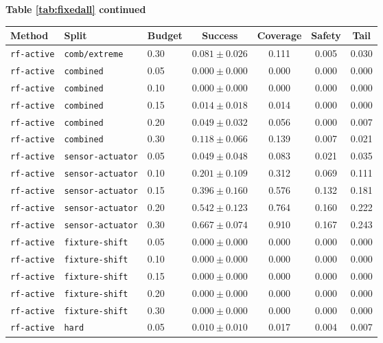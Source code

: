 \documentclass{article}
\begin{document}
\begin{center}
\textbf{Table \ref{tab:fixedall} continued}\\[0.4ex]
\begin{tabular}{lllcccc}
\toprule
Method & Split & Budget & Success & Coverage & Safety & Tail \\
\midrule
\texttt{rf-active} & \texttt{comb/extreme} & 0.30 & $0.081 \pm 0.026$ & 0.111 & 0.005 & 0.030 \\
\texttt{rf-active} & \texttt{combined} & 0.05 & $0.000 \pm 0.000$ & 0.000 & 0.000 & 0.000 \\
\texttt{rf-active} & \texttt{combined} & 0.10 & $0.000 \pm 0.000$ & 0.000 & 0.000 & 0.000 \\
\texttt{rf-active} & \texttt{combined} & 0.15 & $0.014 \pm 0.018$ & 0.014 & 0.000 & 0.000 \\
\texttt{rf-active} & \texttt{combined} & 0.20 & $0.049 \pm 0.032$ & 0.056 & 0.000 & 0.007 \\
\texttt{rf-active} & \texttt{combined} & 0.30 & $0.118 \pm 0.066$ & 0.139 & 0.007 & 0.021 \\
\texttt{rf-active} & \texttt{sensor-actuator} & 0.05 & $0.049 \pm 0.048$ & 0.083 & 0.021 & 0.035 \\
\texttt{rf-active} & \texttt{sensor-actuator} & 0.10 & $0.201 \pm 0.109$ & 0.312 & 0.069 & 0.111 \\
\texttt{rf-active} & \texttt{sensor-actuator} & 0.15 & $0.396 \pm 0.160$ & 0.576 & 0.132 & 0.181 \\
\texttt{rf-active} & \texttt{sensor-actuator} & 0.20 & $0.542 \pm 0.123$ & 0.764 & 0.160 & 0.222 \\
\texttt{rf-active} & \texttt{sensor-actuator} & 0.30 & $0.667 \pm 0.074$ & 0.910 & 0.167 & 0.243 \\
\texttt{rf-active} & \texttt{fixture-shift} & 0.05 & $0.000 \pm 0.000$ & 0.000 & 0.000 & 0.000 \\
\texttt{rf-active} & \texttt{fixture-shift} & 0.10 & $0.000 \pm 0.000$ & 0.000 & 0.000 & 0.000 \\
\texttt{rf-active} & \texttt{fixture-shift} & 0.15 & $0.000 \pm 0.000$ & 0.000 & 0.000 & 0.000 \\
\texttt{rf-active} & \texttt{fixture-shift} & 0.20 & $0.000 \pm 0.000$ & 0.000 & 0.000 & 0.000 \\
\texttt{rf-active} & \texttt{fixture-shift} & 0.30 & $0.000 \pm 0.000$ & 0.000 & 0.000 & 0.000 \\
\texttt{rf-active} & \texttt{hard} & 0.05 & $0.010 \pm 0.010$ & 0.017 & 0.004 & 0.007 \\

\end{tabular}
\end{center}
\end{document}
